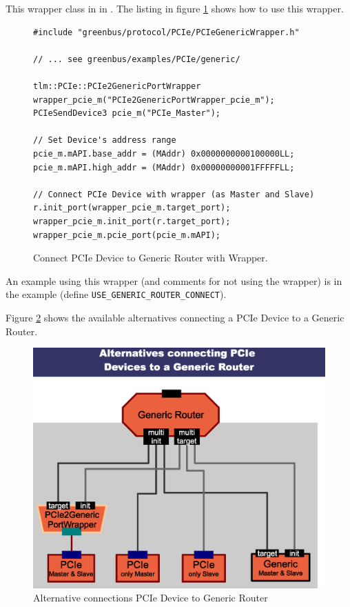 This wrapper class in in . The listing in figure \ref {fig:lstWrapper} shows how to use this wrapper. 

\begin{figure}[H]%
	\begin{lstlisting}
#include "greenbus/protocol/PCIe/PCIeGenericWrapper.h"

// ... see greenbus/examples/PCIe/generic/

tlm::PCIe::PCIe2GenericPortWrapper wrapper_pcie_m("PCIe2GenericPortWrapper_pcie_m");
PCIeSendDevice3 pcie_m("PCIe_Master");

// Set Device's address range
pcie_m.mAPI.base_addr = (MAddr) 0x0000000000100000LL;
pcie_m.mAPI.high_addr = (MAddr) 0x00000000001FFFFFLL;

// Connect PCIe Device with wrapper (as Master and Slave)
r.init_port(wrapper_pcie_m.target_port);
wrapper_pcie_m.init_port(r.target_port);
wrapper_pcie_m.pcie_port(pcie_m.mAPI);
	\end{lstlisting}
	\caption{Connect PCIe Device to Generic Router with Wrapper.}
	\label{fig:lstWrapper}
\end{figure}

An example using this wrapper (and comments for not using the wrapper) is in the example  (define \lstinline|USE_GENERIC_ROUTER_CONNECT|).

Figure \ref{fig:ConnPCIeDev2GenRouter} shows the available alternatives connecting a PCIe Device to a Generic Router.

\begin{figure}[H]%
	\centerline{
		\includegraphics[width=13cm]{figures/Conn_PCIeDev_GenericRouter.eps} 
	}
	\caption{Alternative connections PCIe Device to Generic Router}
	\label{fig:ConnPCIeDev2GenRouter}
\end{figure}


